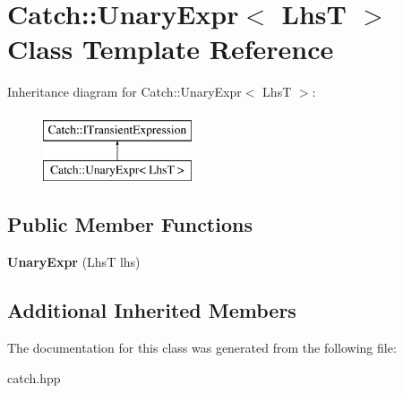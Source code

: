 \hypertarget{class_catch_1_1_unary_expr}{}\section{Catch\+:\+:Unary\+Expr$<$ LhsT $>$ Class Template Reference}
\label{class_catch_1_1_unary_expr}
Inheritance diagram for Catch\+:\+:Unary\+Expr$<$ LhsT $>$\+:\begin{figure}[H]
\begin{center}
\leavevmode
\includegraphics[height=2.000000cm]{class_catch_1_1_unary_expr}
\end{center}
\end{figure}
\subsection*{Public Member Functions}
\begin{DoxyCompactItemize}
\item 
\mbox{\label{class_catch_1_1_unary_expr_ae02f666a1e64da728628aa2033e1d6e7}} 
{\bfseries Unary\+Expr} (LhsT lhs)
\end{DoxyCompactItemize}
\subsection*{Additional Inherited Members}


The documentation for this class was generated from the following file\+:\begin{DoxyCompactItemize}
\item 
catch.\+hpp\end{DoxyCompactItemize}
